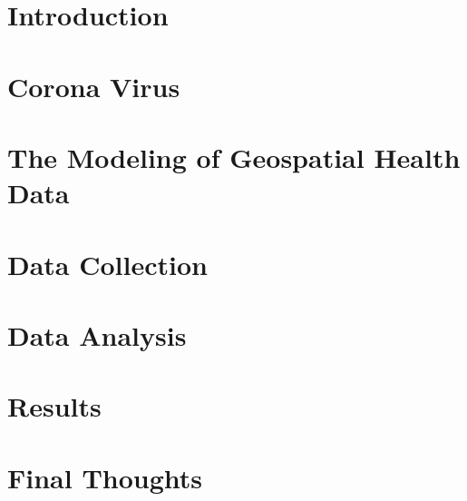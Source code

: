 \documentclass[12pt]{article}
\begin{document}
\section{Introduction}
\section{Corona Virus}
\section{The Modeling of Geospatial Health Data}
\section{Data Collection}
\section{Data Analysis}
\section{Results}
\section{Final Thoughts}
\end{document}
